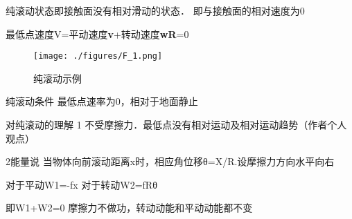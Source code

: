 
纯滚动状态即接触面没有相对滑动的状态．
即与接触面的相对速度为0

最低点速度V=平动速度\textbf{v}+转动速度\textbf{wR}=0
\begin{figure}[ht]
\centering
\texttt{[image: ./figures/F\_1.png]}
\caption{纯滚动示例} \label{F_fig1}
\end{figure}

纯滚动条件
最低点速率为0，相对于地面静止


对纯滚动的理解
1
不受摩擦力．最低点没有相对运动及相对运动趋势（作者个人观点）



2能量说
当物体向前滚动距离x时，相应角位移θ=X/R.设摩擦力方向水平向右

对于平动W1=-fx
对于转动W2=fRθ


即W1+W2=0
摩擦力不做功，转动动能和平动动能都不变